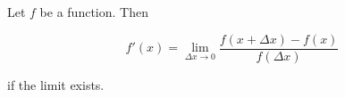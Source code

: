\documentclass{article}
\begin{document}

Let $f$ be a function. Then

$$f'(x) = \lim_{\Delta x \to 0} \frac{f(x + \Delta x) - f(x)}{f(\Delta x)}$$

if the limit exists.
\end{document}
